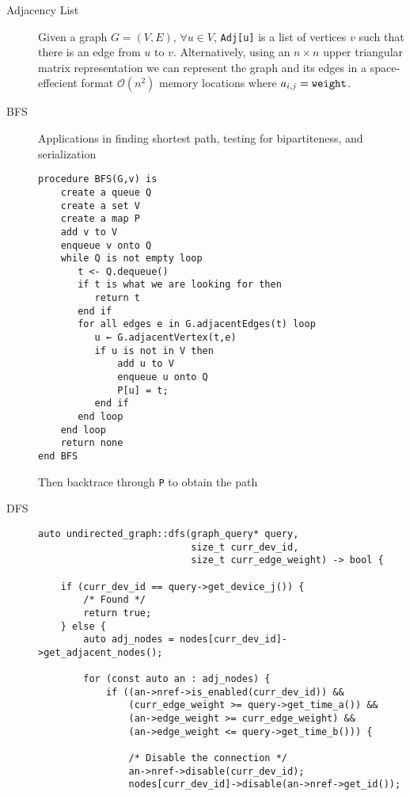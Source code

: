 \documentclass[8pt]{article}
\begin{document}

\begin{multicols}{2}
  \begin{description}
  \item[Adjacency List] Given a graph $G=(V,E)$, $\forall u \in V$,
    \verb|Adj[u]| is a list of vertices $v$ such that there is an edge
    from $u$ to $v$. Alternatively, using an $n \times n$ upper
    triangular matrix representation we can represent the graph and
    its edges in a space-effecient format $\mathcal{O}(n^2)$ memory
    locations where $a_{i,j}=\verb|weight|$.
  \item[BFS] Applications in finding shortest path, testing for
    bipartiteness, and serialization
    { \footnotesize
\begin{verbatim}
procedure BFS(G,v) is
    create a queue Q
    create a set V
    create a map P
    add v to V
    enqueue v onto Q
    while Q is not empty loop
       t <- Q.dequeue()
       if t is what we are looking for then
          return t
       end if
       for all edges e in G.adjacentEdges(t) loop
          u ← G.adjacentVertex(t,e)
          if u is not in V then
              add u to V
              enqueue u onto Q
              P[u] = t;
          end if
       end loop
    end loop
    return none
end BFS
\end{verbatim}
      Then backtrace through \verb|P| to obtain the path
    }
  \item[DFS]
    { \footnotesize
\begin{verbatim}
auto undirected_graph::dfs(graph_query* query,
                           size_t curr_dev_id,
                           size_t curr_edge_weight) -> bool {

    if (curr_dev_id == query->get_device_j()) {
        /* Found */
        return true;
    } else {
        auto adj_nodes = nodes[curr_dev_id]->get_adjacent_nodes();

        for (const auto an : adj_nodes) {
            if ((an->nref->is_enabled(curr_dev_id)) &&
                (curr_edge_weight >= query->get_time_a()) &&
                (an->edge_weight >= curr_edge_weight) &&
                (an->edge_weight <= query->get_time_b())) {

                /* Disable the connection */
                an->nref->disable(curr_dev_id);
                nodes[curr_dev_id]->disable(an->nref->get_id());


\end{verbatim}}
\end{description}
\end{multicols}
\end{document}
